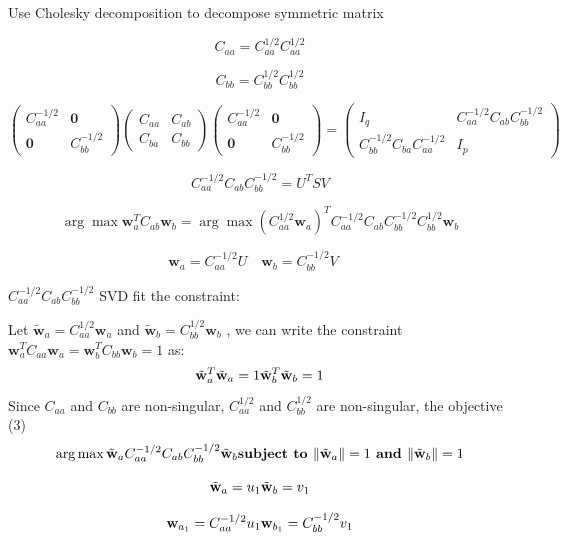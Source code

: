 Use Cholesky decomposition to decompose symmetric matrix 


$$
C_{aa}=C_{aa}^{1/2}C_{aa}^{1/2}
$$

$$
C_{bb}=C_{bb}^{1/2}C_{bb}^{1/2}
$$

$$
\begin{pmatrix}
C_{aa}^{-1/2} & {\mathbf 0}\\
{\mathbf 0} & C_{bb}^{-1/2}
\end{pmatrix}
\begin{pmatrix}
C_{aa} & C_{ab}\\
C_{ba} & C_{bb}
\end{pmatrix}
\begin{pmatrix}
C_{aa}^{-1/2} & {\mathbf 0}\\
{\mathbf 0} & C_{bb}^{-1/2}
\end{pmatrix}
=
\begin{pmatrix}
I_q & C_{aa}^{-1/2}C_{ab}C_{bb}^{-1/2}\\
C_{bb}^{-1/2}C_{ba}C_{aa}^{-1/2} & I_p
\end{pmatrix}
$$


$$
C_{aa}^{-1/2}C_{ab}C_{bb}^{-1/2}=U^TSV
$$

$$
\arg\max {\mathbf w}_a^T C_{ab}{\mathbf w}_b=\arg\max (C_{aa}^{1/2}{\mathbf w}_a)^TC_{aa}^{-1/2}C_{ab}C_{bb}^{-1/2}C_{bb}^{1/2}{\mathbf w}_b
$$


$$
{\mathbf w}_a = C_{aa}^{-1/2}U\quad {\mathbf w}_b = C_{bb}^{-1/2}V\quad
$$

$C_{aa}^{-1/2}C_{ab}C_{bb}^{-1/2}$ SVD fit the constraint:

Let $\tilde{{\mathbf w}}_a=C_{aa}^{1/2}{\mathbf w}_a$ and  $\tilde{{\mathbf w}}_b=C_{bb}^{1/2}{\mathbf w}_b$ , we can write the constraint ${\mathbf w}_a^T C_{aa}{\mathbf w}_a={\mathbf w}_b^T C_{bb}{\mathbf w}_b=1$ as:
$$
\tilde{{\mathbf w}}_a^T\tilde{{\mathbf w}}_a=1\\
\tilde{{\mathbf w}}_b^T\tilde{{\mathbf w}}_b=1
$$
Since $C_{aa}$ and $C_{bb}$ are non-singular, $C_{aa}^{1/2}$ and $C_{bb}^{1/2}$ are non-singular, the objective (3)
$$
\arg\max \tilde{{\mathbf w}}_a C_{aa}^{-1/2}C_{ab}C_{bb}^{-1/2}\tilde{{\mathbf w}}_b\\
\textbf{subject to } \|\tilde{\mathbf w}_a\|=1\textbf{ and  }\|\tilde{\mathbf w}_b\|=1
$$

$$
\tilde{\mathbf w}_a=u_1\\
\tilde{\mathbf w}_b=v_1
$$

$$
{\mathbf w}_{a_1}=C_{aa}^{-1/2}u_1\\
{\mathbf w}_{b_1}=C_{bb}^{-1/2}v_1
$$




